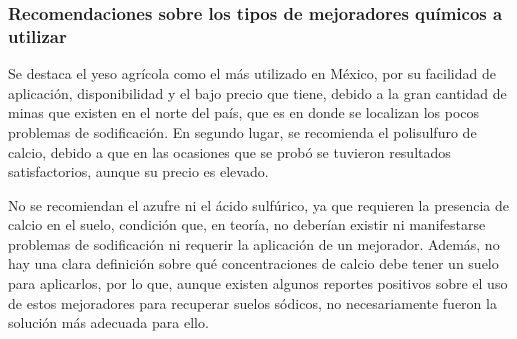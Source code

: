 \subsubsection{Recomendaciones sobre los tipos de mejoradores químicos a utilizar}
Se destaca el yeso agrícola como el más utilizado en México, por su facilidad de aplicación, disponibilidad y el bajo precio que tiene, debido a la gran cantidad de minas que existen en el norte del país, que es en donde se localizan los pocos problemas de sodificación. En segundo lugar, se recomienda el polisulfuro de calcio, debido a que en las ocasiones que se probó se tuvieron resultados satisfactorios, aunque su precio es elevado.

No se recomiendan el azufre ni el ácido sulfúrico, ya que requieren la presencia de calcio en el suelo, condición que, en teoría, no deberían existir ni manifestarse problemas de sodificación ni requerir la aplicación de un mejorador. Además, no hay una clara definición sobre qué concentraciones de calcio debe tener un suelo para aplicarlos, por lo que, aunque existen algunos reportes positivos sobre el uso de estos mejoradores para recuperar suelos sódicos, no necesariamente fueron la solución más adecuada para ello.


